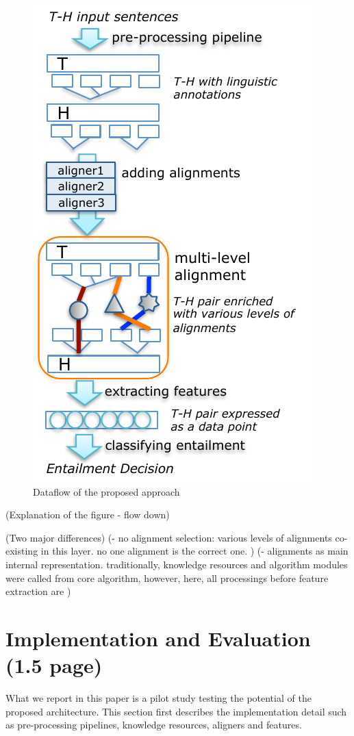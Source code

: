 \documentclass[11pt,letterpaper]{article}
\begin{document}
\begin{figure}[t!b]
  \centering
  \includegraphics[width=0.8\columnwidth]{figures/figure1.pdf}
  \caption{Dataflow of the proposed approach}
  \label{fig:1}
\end{figure}

(Explanation of the figure - flow down) 

(Two major differences) 
(- no alignment selection: various levels of alignments co-existing in
this layer. no one alignment is the correct one. ) 
(- alignments as main internal representation. traditionally,
knowledge resources and algorithm modules were called from core
algorithm, however, here, all processings before feature extraction
are  )


\section{Implementation and Evaluation (1.5 page)}
What we report in this paper is a pilot study testing the potential of
the proposed architecture. This section first describes the
implementation detail such as pre-processing pipelines, knowledge
resources, aligners and features. 
\end{document}
